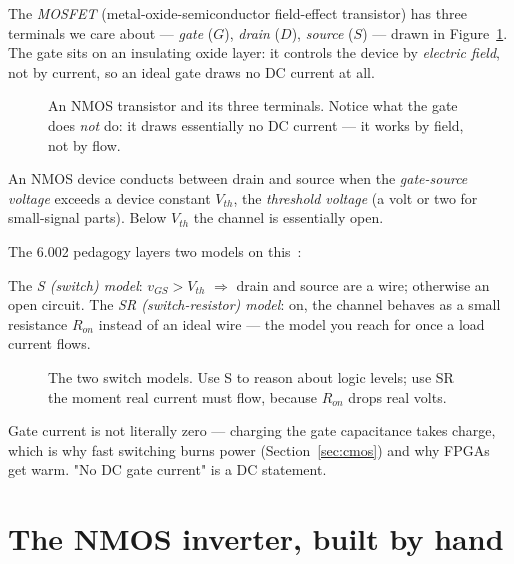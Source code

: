 The \emph{MOSFET} (metal-oxide-semiconductor field-effect
transistor) has three terminals we care about — \emph{gate} ($G$),
\emph{drain} ($D$), \emph{source} ($S$) — drawn in
Figure~\ref{fig:mosfet}. The gate sits on an insulating oxide layer: it
controls the device by \emph{electric field}, not by current, so an ideal
gate draws no DC current at all.

\begin{figure}[htbp]
\centering

\caption{An NMOS transistor and its three terminals. Notice what the gate
does \emph{not} do: it draws essentially no DC current — it works by field,
not by flow.}
\label{fig:mosfet}
\end{figure}

\begin{definition}
An NMOS device conducts between drain and source when the
\emph{gate-source voltage} exceeds a device constant $V_{th}$, the
\emph{threshold voltage} (a volt or two for small-signal parts). Below
$V_{th}$ the channel is essentially open.
\end{definition}

The 6.002 pedagogy layers two models on this~\cite{ocw6002}:

\begin{definition}
The \emph{S (switch) model}: $v_{GS} > V_{th}$ $\Rightarrow$ drain and
source are a wire; otherwise an open circuit. The \emph{SR (switch-resistor)
model}: on, the channel behaves as a small resistance $R_{on}$ instead of an
ideal wire — the model you reach for once a load current flows.
\end{definition}

\begin{figure}[htbp]
\centering

\caption{The two switch models. Use S to reason about logic levels; use SR
the moment real current must flow, because $R_{on}$ drops real volts.}
\label{fig:ssr}
\end{figure}

\begin{remark}
Gate current is not literally zero — charging the gate capacitance takes
charge, which is why fast switching burns power (Section~\ref{sec:cmos})
and why FPGAs get warm. "No DC gate current" is a DC statement.
\end{remark}

\section{The NMOS inverter, built by hand}
\label{sec:nmosinv}

